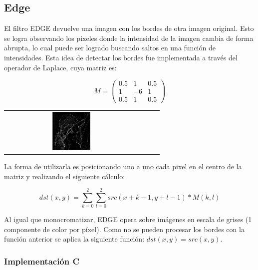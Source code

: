 \subsection{Edge}

\begin{multicols}{2}
El filtro EDGE devuelve una imagen con los bordes de otra imagen original. Esto se logra observando los pixeles donde la intensidad de la imagen cambia de forma abrupta, lo cual puede ser logrado buscando saltos en una función de intensidades. Esta idea de detectar los bordes fue implementada a través del operador de Laplace, cuya matriz es: 

$$ M = \left(
\begin{matrix}
    0.5 & 1 & 0.5 \\
    1 & -6 & 1 \\
    0.5 & 1 & 0.5
\end{matrix}
\right)$$

\begin{center}
	\begin{tabular}{cccc}
		\includegraphics[width=0.3\textwidth]{imagenes/lenaEDGA.jpg} \\
		\end{tabular}
	\end{center}
\end{multicols}

La forma de utilizarla es posicionando uno a uno cada pixel en el centro de la matriz y realizando el siguiente cálculo: 

$$dst(x, y) = \sum_{k = 0}^2 \sum_{l = 0}^2 src(x + k - 1, y + l - 1) * M(k, l)$$

Al igual que monocromatizar, EDGE opera sobre imágenes en escala de grises (1 componente de color por píxel).
Como no se pueden procesar los bordes con la función anterior se aplica la siguiente función: $dst(x, y) = src(x,y)$.

\subsubsection{Implementación C}

